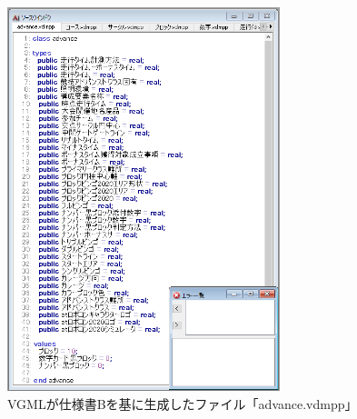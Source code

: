 \begin{figure}[p]
    \begin{center}
    \includegraphics[width=300]{image/indicationB_vdm1.PNG}
    \caption{VGMLが仕様書Bを基に生成したファイル「advance.vdmpp」}
    \label{fig:indicationB_vdm1}
    \end{center}
\end{figure}

